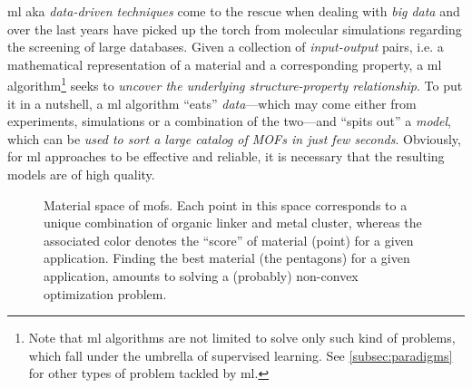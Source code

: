 \Gls{ml} aka \emph{data-driven
techniques} come to the rescue when dealing with \emph{big data}
and over the last years have picked up the torch from molecular simulations
regarding the screening of large databases. Given a collection of
\emph{input-output} pairs, i.e. a mathematical
representation of a material and a corresponding property, a \gls{ml}
algorithm\footnote{Note that \gls{ml}
algorithms are not limited to solve only such kind of problems, which fall under
the umbrella of supervised learning. See \Section{}
\ref{subsec:paradigms} for other types of problem tackled by \gls{ml}.} seeks to
\emph{uncover the underlying structure-property relationship}. To put it in a
nutshell, a \gls{ml} algorithm ``eats'' \emph{data}---which may come
either from experiments, simulations or a combination of the two---and ``spits
out'' a \emph{model}, which can be \emph{used to sort a large
catalog of MOFs in just few seconds}. Obviously, for \gls{ml} approaches to be
effective and reliable, it is necessary that the resulting models are of high
quality.

\begin{figure}
	\centering
	\caption[Material space of .]{Material space of \glspl{mof}. Each point in this space corresponds to a unique
	combination of organic linker and metal cluster, whereas the associated
	color denotes the ``score'' of material (point) for a given application.
	Finding the best material (the pentagons) for a given application, amounts
	to solving a (probably) non-convex optimization
	problem.}
	\label{fig:mofs_space}
\end{figure}

